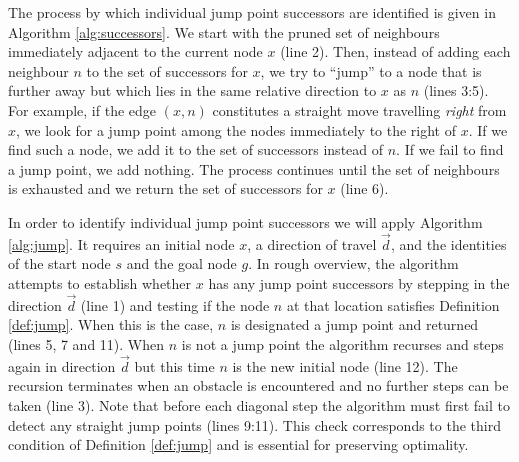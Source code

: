The process by which individual jump point successors are identified is given in
Algorithm \ref{alg:successors}.  We start with the pruned set of neighbours
immediately adjacent to the current node $x$ (line 2).  Then, instead of adding each
neighbour $n$ to the set of successors for $x$, we try to ``jump'' to a node
that is further away but which lies in the same relative direction to $x$ as $n$
(lines 3:5).  For example, if the edge $(x, n)$ constitutes a straight move
travelling \emph{right} from $x$, we look for a jump point among the nodes
immediately to the right of $x$.  If we find such a node, we add it to the set
of successors instead of $n$.  If we fail to find a jump point,
we add nothing.  The process continues until the set of neighbours is
exhausted and we return the set of successors for $x$ (line 6).

In order to identify individual jump point successors we will apply Algorithm
\ref{alg:jump}. It requires an initial node $x$, a direction of travel
$\vec{d}$, and the identities of 
the start node $s$ and the goal node $g$.
In rough overview, the algorithm attempts to establish whether $x$ has any 
jump point successors by stepping in the direction $\vec{d}$ (line 1) and testing
if the node $n$ at that location satisfies Definition \ref{def:jump}.
When this is the case, $n$ is designated a jump point and returned (lines 5, 7
and 11).
When $n$ is not a jump point the algorithm recurses and steps again in direction
$\vec{d}$ but this time $n$ is the new initial node (line 12).
The recursion terminates when an obstacle is encountered and no further
steps can be taken (line 3).
Note that before each diagonal step the algorithm must first 
fail to detect any straight jump points (lines 9:11). 
This check corresponds to the third condition of Definition \ref{def:jump} 
and is essential for preserving optimality.

